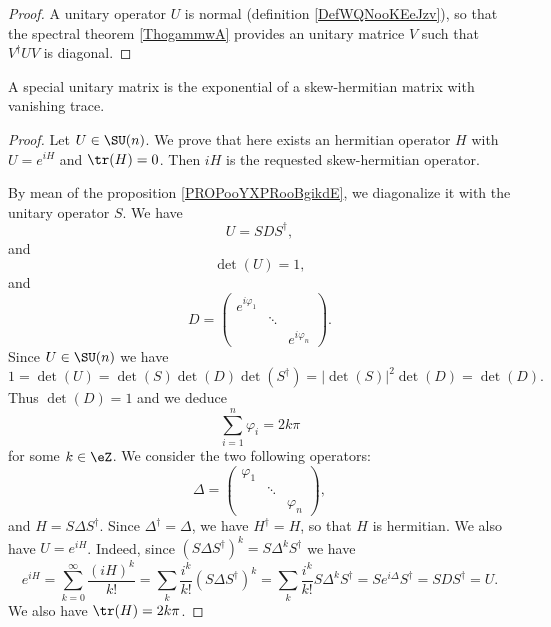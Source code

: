 \begin{proof}
    A unitary operator \( U\) is normal (definition \ref{DefWQNooKEeJzv}), so that the spectral theorem \ref{ThogammwA} provides an unitary matrice \( V\) such that \( V^{\dag}UV\) is diagonal.
\end{proof}

\begin{proposition}     \label{PROPooZBJSooEIguXR}
    A special unitary matrix is the exponential of a skew-hermitian matrix with vanishing trace. 
\end{proposition}

\begin{proof}
    Let \( U\in \SU(n)\). We prove that here exists an hermitian operator \( H\) with \( U= e^{iH}\) and \( \tr(H)=0\). Then \( iH\) is the requested skew-hermitian operator.

    By mean of the proposition \ref{PROPooYXPRooBgikdE}, we diagonalize it with the unitary operator \( S\). We have 
    \begin{equation}
        U=SDS^{\dag},
    \end{equation}
    and
    \begin{equation}
        \det(U)=1,
    \end{equation}
    and
    \begin{equation}
        D=\begin{pmatrix}
            e^{i\varphi_1}    &       &       \\
                &   \ddots    &       \\
                &       &    e^{i\varphi_n}
        \end{pmatrix}.
    \end{equation}
    Since \( U\in\SU(n)\) we have
    \begin{equation}
        1=\det(U)=\det(S)\det(D)\det(S^{\dag})=| \det(S) |^2\det(D)=\det(D).
    \end{equation}
    Thus \( \det(D)=1\) and we deduce
    \begin{equation}
        \sum_{i=1}^n\varphi_i=2k\pi
    \end{equation}
    for some \( k\in \eZ\). We consider the two following  operators:
    \begin{equation}
        \Delta=\begin{pmatrix}
            \varphi_1    &       &       \\
                &   \ddots    &       \\
                &       &   \varphi_n
        \end{pmatrix},
    \end{equation}
    and \( H=S\Delta S^{\dag}\). Since \( \Delta^{\dag}=\Delta\), we have \( H^{\dag}=H\), so that \( H\) is hermitian. We also have \( U= e^{iH}\). Indeed, since \( (S\Delta S^{\dag})^k=S\Delta^kS^{\dag}\) we have
    \begin{equation}
        e^{iH}=\sum_{k=0}^{\infty}\frac{ (iH)^k }{ k! }=\sum_k\frac{ i^k }{ k! }(S\Delta S^{\dag})^k=\sum_k\frac{ i^k }{ k! }S\Delta^kS^{\dag}=S e^{i\Delta}S^{\dag}=SDS^{\dag}=U.
    \end{equation}
    We also have \( \tr(H)=2k\pi\).
    

\end{proof}
